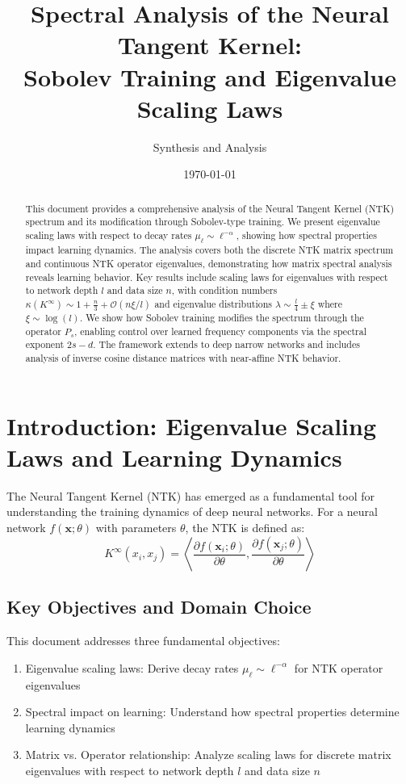 \documentclass{article}
\title{Spectral Analysis of the Neural Tangent Kernel:\\
Sobolev Training and Eigenvalue Scaling Laws}
\author{Synthesis and Analysis}
\date{\today}
\newcommand{\x}{\mathbf{x}}
\begin{document}
\maketitle

\begin{abstract}
This document provides a comprehensive analysis of the Neural Tangent Kernel (NTK) spectrum and its modification through Sobolev-type training. We present eigenvalue scaling laws with respect to decay rates $\mu_\ell \sim \ell^{-\alpha}$, showing how spectral properties impact learning dynamics. The analysis covers both the discrete NTK matrix spectrum and continuous NTK operator eigenvalues, demonstrating how matrix spectral analysis reveals learning behavior. Key results include scaling laws for eigenvalues with respect to network depth $l$ and data size $n$, with condition numbers $\kappa(K^{\infty}) \sim 1 + \frac{n}{3} + \mathcal{O}(n \xi / l)$ and eigenvalue distributions $\lambda \sim \frac{l}{4} \pm \xi$ where $\xi \sim \log(l)$. We show how Sobolev training modifies the spectrum through the operator $P_s$, enabling control over learned frequency components via the spectral exponent $2s-d$. The framework extends to deep narrow networks and includes analysis of inverse cosine distance matrices with near-affine NTK behavior.
\end{abstract}

\tableofcontents
\newpage

\section{Introduction: Eigenvalue Scaling Laws and Learning Dynamics}

The Neural Tangent Kernel (NTK) has emerged as a fundamental tool for understanding the training dynamics of deep neural networks. For a neural network $f(\x; \theta)$ with parameters $\theta$, the NTK is defined as:
$$K^{\infty}(x_i, x_j) = \left\langle \frac{\partial f(\x_i; \theta)}{\partial \theta}, \frac{\partial f(\x_j; \theta)}{\partial \theta} \right\rangle$$

\subsection{Key Objectives and Domain Choice}

This document addresses three fundamental objectives:
\begin{enumerate}
\item Eigenvalue scaling laws: Derive decay rates $\mu_\ell \sim \ell^{-\alpha}$ for NTK operator eigenvalues
\item Spectral impact on learning: Understand how spectral properties determine learning dynamics  
\item Matrix vs. Operator relationship: Analyze scaling laws for discrete matrix eigenvalues with respect to network depth $l$ and data size $n$
\end{enumerate}
\end{document}
